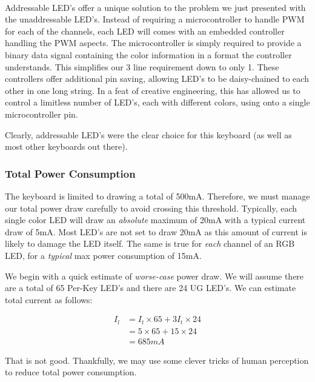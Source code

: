 \documentclass[11pt]{article}
\begin{document}
\


Addressable LED's offer a unique solution to the problem we just presented with the unaddressable LED's. Instead of requiring a microcontroller to handle PWM for each of the channels, each LED will comes with an embedded controller handling the PWM aspects. The microcontroller is simply required to provide a binary data signal containing the color information in a format the controller understands. This simplifies our 3 line requirement down to only 1. These controllers offer additional pin saving, allowing LED's to be daisy-chained to each other in one long string. In a feat of creative engineering, this has allowed us to control a limitless number of LED's, each with different colors, using onto a single microcontroller pin. 

Clearly, addressable LED's were the clear choice for this keyboard (as well as most other keyboards out there). 

\subsubsection{Total Power Consumption}

The keyboard is limited to drawing a total of 500mA.\footnotemark {} Therefore, we must manage our total power draw carefully to avoid crossing this threshold. Typically, each single color LED will draw an \emph{absolute} maximum of 20mA with a typical current draw of 5mA. Most LED's are not set to draw 20mA as this amount of current is likely to damage the LED itself. The same is true for \emph{each} channel of an RGB LED, for a \emph{typical} max power consumption of 15mA.

We begin with a quick estimate of \emph{worse-case} power draw. We will assume there are a total of 65 Per-Key LED's\footnotemark {} and there are 24 UG LED's. We can estimate total current as follows:

\begin{equation}
\begin{aligned}
	I_l &= I_t \times 65 + 3 I_t \times 24 \\
	&= 5 \times 65 + 15 \times 24 \\
	&= 685mA
\end{aligned}
\end{equation}

That is not good. Thankfully, we may use some clever tricks of human perception to reduce total power consumption. 
\end{document}
